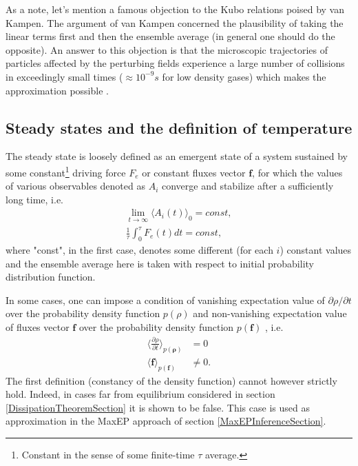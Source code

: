 \documentclass[a4paper,12pt]{article}
\begin{document}
As a note, let's mention a famous objection to the Kubo relations poised by van Kampen. The argument of van Kampen concerned the plausibility of taking the linear terms first and then the ensemble average (in general one should do the opposite). An answer to this objection is that the microscopic trajectories of particles affected by the perturbing fields experience a large number of collisions in exceedingly small times ($\approx 10^{-9}s$ for low density gases) which makes the approximation possible \cite{Dorfman:ozm67-zD}.
\subsection{Steady states and the definition of temperature}

The steady state is loosely defined as an emergent state of a system sustained by some constant\footnote{Constant in the sense of some finite-time $\tau$ average.} driving force $F_e$ or constant fluxes vector $\bm{f}$, for which the values of various observables denoted as $A_i$ converge and stabilize after a sufficiently long time, i.e.
\begin{equation}
\begin{aligned}
  \lim_{t \to \infty} \langle A_i(t) \rangle_0 = const,\\
  \frac{1}{\tau} \int_0^{\tau} F_e(t) dt =const,
\end{aligned}
\end{equation}
where "const", in the first case, denotes some different (for each $i$) constant values and the ensemble average here is taken with respect to initial probability distribution function.

In some cases, one can impose a condition of vanishing expectation value of $\partial \rho / \partial t$ over the probability density function $p(\rho)$ and non-vanishing expectation value of fluxes vector $\bm{f}$ over the probability density function $p(\bm{f})$ \cite{Dewar:2014ek}, i.e.
\begin{equation}
\begin{aligned}
\label{SteadyStates}
  \langle \frac{\partial \rho}{\partial t} \rangle_{p(\bm{\rho})} &= 0 \\
  \langle \bm{f} \rangle_{p(\bm{f})} &\neq 0.
\end{aligned}
\end{equation}
The first definition (constancy of the density function) cannot however strictly hold. Indeed, in cases far from equilibrium considered in section \ref{DissipationTheoremSection} it is shown to be false. This case is used as approximation in the MaxEP approach of section \ref{MaxEPInferenceSection}.
\end{document}
